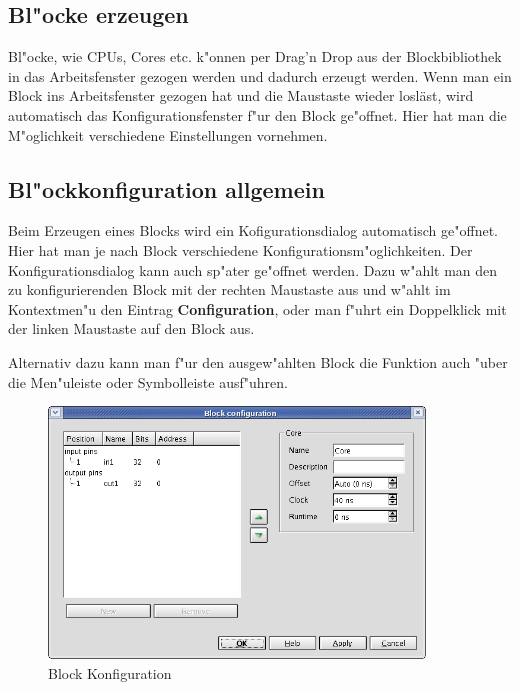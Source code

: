 \documentclass[a4paper,titlepage,12pt,ngerman]{scrbook}
\begin{document}
\subsection{Bl"ocke erzeugen}
Bl"ocke, wie CPUs, Cores etc. k"onnen per Drag'n Drop aus der Blockbibliothek in das Arbeitsfenster gezogen werden und dadurch erzeugt werden. Wenn man ein Block ins Arbeitsfenster gezogen hat und die Maustaste wieder losläst, wird automatisch das Konfigurationsfenster f"ur den Block ge"offnet. Hier hat man die M"oglichkeit verschiedene Einstellungen vornehmen.

\subsection{Bl"ockkonfiguration allgemein}
Beim Erzeugen eines Blocks wird ein Kofigurationsdialog automatisch ge"offnet. Hier hat man je nach Block verschiedene Konfigurationsm"oglichkeiten. Der Konfigurationsdialog kann auch sp"ater ge"offnet werden. Dazu w"ahlt man den zu konfigurierenden Block mit der rechten Maustaste aus und w"ahlt im Kontextmen"u den Eintrag {\bf Configuration}, oder man f"uhrt ein Doppelklick mit der linken Maustaste auf den Block aus.\par
Alternativ dazu kann man f"ur den ausgew"ahlten Block die Funktion auch "uber die Men"uleiste oder Symbolleiste ausf"uhren. \par

\begin{figure}[htbp]

\begin{center}

\includegraphics[width=10cm]{CoreBlockConfiguration}

\caption{Block Konfiguration}\label{test}

\end{center}

\end{figure}
\end{document}
